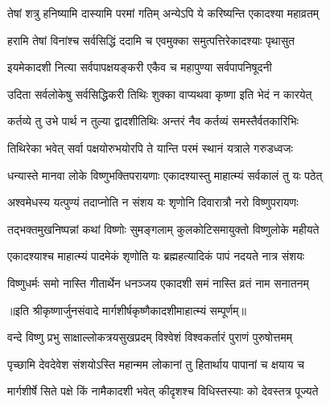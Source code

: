\twolineshloka
{तेषां शत्रु हनिष्यामि दास्यामि परमां गतिम्}
{अन्येऽपि ये करिष्यन्ति एकादश्या महाव्रतम्} %

\twolineshloka
{हरामि तेषां विनांश्च सर्वसिद्धिं ददामि च}
{एवमुक्का समुत्पत्तिरेकादश्याः पृथासुत} %

\twolineshloka
{इयमेकादशी नित्या सर्वपापक्षयङ्करी}
{एकैव च महापुण्या सर्वपापनिषूदनी} %

\twolineshloka
{उदिता सर्वलोकेषु सर्वसिद्धिकरी तिथिः}
{शुक्का वाप्यथवा कृष्णा इति भेदं न कारयेत्} %

\twolineshloka
{कर्तव्ये तु उभे पार्थ न तुल्या द्वादशीतिथिः}
{अन्तरं नैव कर्तव्यं समस्तैर्वतकारिभिः} %

\twolineshloka
{तिथिरेका भवेत् सर्वा पक्षयोरुभयोरपि}
{ते यान्ति परमं स्थानं यत्राले गरुडध्वजः} %

\twolineshloka
{धन्यास्ते मानवा लोके विष्णुभक्तिपरायणाः}
{एकादश्यास्तु माहात्म्यं सर्वकालं तु यः पठेत्} %

\twolineshloka
{अश्वमेधस्य यत्पुण्यं तदाप्नोति न संशय}
{यः शृणोनि दिवारात्रौ नरो विष्णुपरायणः} %

\twolineshloka
{तद्भक्तमुखनिष्पन्नां कथां विष्णोः सुमङ्गलाम्}
{कुलकोटिसमायुक्तो विष्णुलोके महीयते} %

\twolineshloka
{एकादश्याश्च माहात्म्यं पादमेकं शृणोति यः}
{ब्रह्महत्यादिकं पापं नदयते नात्र संशयः} %

\twolineshloka
{विष्णुधर्मः समो नास्ति गीतार्थेन धनञ्जय}
{एकादशी समं नास्ति व्रतं नाम सनातनम्} %

॥इति श्रीकृष्णार्जुनसंवादे मार्गशीर्षकृष्णैकादशीमाहात्म्यं सम्पूर्णम्॥


\hyperref[sec:ekadashi_mahatmyam_vrata_raja]{\closesub}
\clearpage

\label{sec:vrata-raja-margashirsha-shukla-mokshada}


\twolineshloka
{वन्दे विष्णु प्रभु साक्षाल्लोकत्रयसुखप्रदम्}
{विश्वेशं विश्वकर्तारं पुराणं पुरुषोत्तमम्} %

\twolineshloka
{पृच्छामि देवदेवेश संशयोऽस्ति महान्मम}
{लोकानां तु हितार्थाय पापानां च क्षयाय च} %

\twolineshloka
{मार्गशीर्षे सिते पक्षे किं नामैकादशी भवेत्}
{कीदृशश्च विधिस्तस्याः को देवस्तत्र पूज्यते} %



